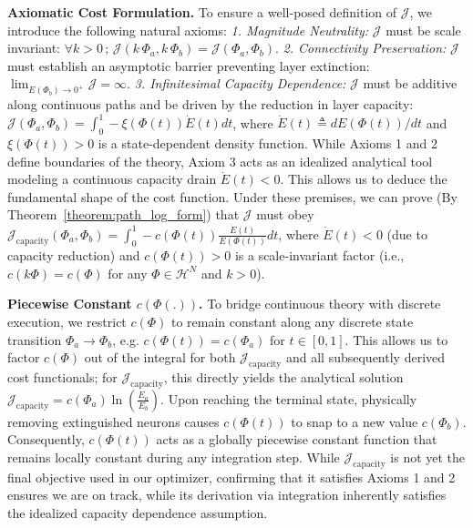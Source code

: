 \documentclass[11pt, a4paper, copyright, gdm]{google}
\newcommand{\calH}{\mathcal{H}}
\newcommand{\calJ}{\mathcal{J}}
\theoremstyle{definition}
\begin{document}
\noindent \textbf{Axiomatic Cost Formulation.} To ensure a well-posed definition of $\calJ$, we introduce the following natural axioms: \textit{1. Magnitude Neutrality:} $\calJ$ must be scale invariant: $\forall k > 0 \,;\, \calJ(k\, \Phi_a , k\, \Phi_b) = \calJ(\Phi_a , \Phi_b)$. \textit{2. Connectivity Preservation:} $\calJ$ must establish an asymptotic barrier preventing layer extinction: $\lim_{E(\Phi_b) \rightarrow 0^+} \calJ = \infty$. \textit{3. Infinitesimal Capacity Dependence:} $\calJ$ must be additive along continuous paths and be driven by the reduction in layer capacity:
$\calJ(\Phi_a, \Phi_b) = \int_{0}^{1} -\xi(\Phi(t)) \dot{E}(t) dt$, where $\dot{E}(t) \triangleq dE(\Phi(t))/dt$ and $\xi(\Phi(t)) > 0$ is a state-dependent density function. While Axioms 1 and 2 define boundaries of the theory, Axiom 3 acts as an idealized analytical tool modeling a continuous capacity drain $\dot{E}(t) < 0$. This allows us to deduce the fundamental shape of the cost function. Under these premises, we can prove (By Theorem~\ref{theorem:path_log_form}) that $\calJ$ must obey $\calJ_{\text{capacity}}(\Phi_a, \Phi_b) = \int_{0}^{1} -c(\Phi(t)) \frac{\dot{E}(t)}{E(\Phi(t))} dt$, where $\dot{E}(t) < 0$ (due to capacity reduction) and $c(\Phi(t)) > 0$ is a scale-invariant factor (i.e., $c(k \Phi) = c(\Phi)$ for any $\Phi \in \calH^N$ and $k > 0$).

\noindent \textbf{Piecewise Constant $c(\Phi(.))$.} To bridge continuous theory with discrete execution, we restrict $c(\Phi)$ to remain constant along any discrete state transition $\Phi_a \rightarrow \Phi_b$, e.g. $c(\Phi(t)) = c(\Phi_a)$ for $t \in [0,1]$. This allows us to factor $c(\Phi)$ out of the integral for both $\calJ_{\text{capacity}}$ and all subsequently derived cost functionals; for $\calJ_{\text{capacity}}$, this directly yields the analytical solution $\calJ_{\text{capacity}} = c(\Phi_a) \ln(\frac{E_a}{E_b})$. Upon reaching the terminal state, physically removing extinguished neurons causes $c(\Phi(t))$ to snap to a new value $c(\Phi_b)$. Consequently, $c(\Phi(t))$ acts as a globally piecewise constant function that remains locally constant during any integration step. While $\calJ_{\text{capacity}}$ is not yet the final objective used in our optimizer, confirming that it satisfies Axioms 1 and 2 ensures we are on track, while its derivation via integration inherently satisfies the idealized capacity dependence assumption.
\end{document}
